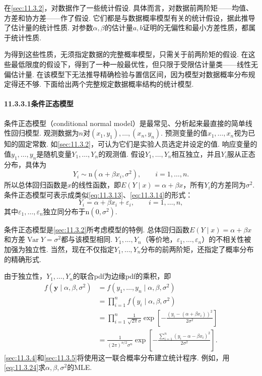 在\autoref{sec:11.3.2}，对数据作了一些统计假设. 具体而言，对数据前两阶矩——均值、方差和协方差——作了假设. 它们都是与数据概率模型有关的统计假设，据此推导了估计量的统计性质. 对参数$\alpha,\beta$的估计量$a,b$证明的无偏性和最小方差性质，都属于统计性质.

为得到这些性质，无须指定数据的完整概率模型，只需关于前两阶矩的假设. 在这些最低限度的假设下，得到了一种一般最优性，但只限于受限估计量类——线性无偏估计量. 在该模型下无法推导精确检验与置信区间，因为模型对数据概率分布规定得还不够. 下面给出两个完整规定数据概率结构的统计模型.

\paragraph{11.3.3.1\quad 条件正态模型}\label{sec:11.3.3.1}
条件正态模型（conditional normal model）是最常见、分析起来最直接的简单线性回归模型. 观测数据为$n$对$(x_1,y_1),\allowbreak\ldots,\allowbreak(x_n,y_n)$. 预测变量的值$x_1,\ldots,x_n$视为已知的固定常数. 如\autoref{sec:11.3.2}，可认为它们是实验人员选定并设定的值.
响应变量的值$y_1,\ldots,y_n$是随机变量$Y_1,\ldots,Y_n$的观测值. 假设$Y_1,\ldots,Y_n$相互独立，并且$Y_i$服从正态分布，具体为
\begin{equation}\label{eq:11.3.22}
Y_i\sim\mathrm n(\alpha+\beta x_i,\sigma^2),\qquad i=1,\ldots,n.
\end{equation}
所以总体回归函数是$x$的线性函数，即$E(Y\mid x)=\alpha+\beta x$，所有$Y_i$的方差同为$\sigma^2$. 条件正态模型可表示成类似\eqref{eq:11.3.13}、\eqref{eq:11.3.14}的形式：
\begin{equation}\label{eq:11.3.23}
Y_i=\alpha+\beta x_i+\varepsilon_i,\qquad i=1,\ldots,n,
\end{equation}
其中$\varepsilon_1,\ldots,\varepsilon_n$独立同分布于$\mathrm n(0,\sigma^2)$.

条件正态模型是\autoref{sec:11.3.2}所考虑模型的特例. 总体回归函数$E(Y\mid x)=\alpha+\beta x$和方差$\operatorname{Var}Y=\sigma^2$都与该模型相同. $Y_1,\ldots,Y_n$（等价地，$\varepsilon_1,\ldots,\varepsilon_n$）的不相关性被加强为独立性. 当然，现在不仅指定$Y_1,\ldots,Y_n$分布的前两阶矩，还指定了概率分布的精确形式.

由于独立性，$Y_1,\ldots,Y_n$的联合pdf为边缘pdf的乘积，即
\begin{equation}\label{eq:11.3.24}
\begin{aligned}
f(\boldsymbol y\mid\alpha,\beta,\sigma^2)
&=f(y_1,\ldots,y_n\mid\alpha,\beta,\sigma^2)\\
&=\prod_{i=1}^nf(y_i\mid\alpha,\beta,\sigma^2)\\
&=\prod_{i=1}^n\frac1{\sqrt{2\pi}\sigma}\exp\left[-\frac{(y_i-(\alpha+\beta x_i))^2}{2\sigma^2}\right]\\
&=\frac1{(2\pi)^{n/2}\sigma^n}\exp\left[-\frac{\sum_{i=1}^n(y_i-\alpha-\beta x_i)^2}{2\sigma^2}\right].
\end{aligned}
\end{equation}
\autoref{sec:11.3.4}和\autoref{sec:11.3.5}将使用这一联合概率分布建立统计程序. 例如，用\eqref{eq:11.3.24}求$\alpha,\beta,\sigma^2$的MLE.

